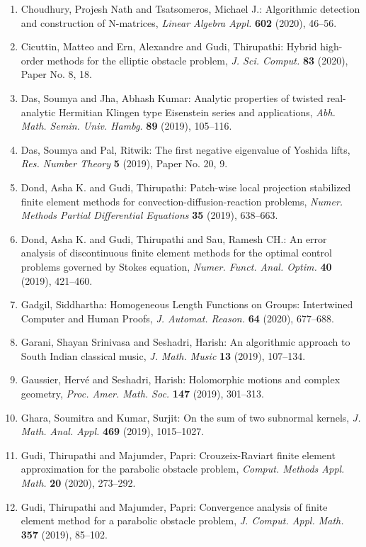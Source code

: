 \begin{enumerate}
\item Choudhury, Projesh Nath and Tsatsomeros, Michael J.: Algorithmic detection and construction of {N}-matrices, \emph{Linear Algebra Appl.} {\bf 602} (2020), 46--56.
\item Cicuttin, Matteo and Ern, Alexandre and Gudi, Thirupathi: Hybrid high-order methods for the elliptic obstacle problem, \emph{J. Sci. Comput.} {\bf 83} (2020), Paper No. 8, 18.
\item Das, Soumya and Jha, Abhash Kumar: Analytic properties of twisted real-analytic {H}ermitian
{K}lingen type {E}isenstein series and applications, \emph{Abh. Math. Semin. Univ. Hambg.} {\bf 89} (2019), 105--116.
\item Das, Soumya and Pal, Ritwik: The first negative eigenvalue of {Y}oshida lifts, \emph{Res. Number Theory} {\bf 5} (2019), Paper No. 20, 9.
\item Dond, Asha K. and Gudi, Thirupathi: Patch-wise local projection stabilized finite element methods
for convection-diffusion-reaction problems, \emph{Numer. Methods Partial Differential Equations} {\bf 35} (2019), 638--663.
\item Dond, Asha K. and Gudi, Thirupathi and Sau, Ramesh CH.: An error analysis of discontinuous finite element methods for
the optimal control problems governed by {S}tokes equation, \emph{Numer. Funct. Anal. Optim.} {\bf 40} (2019), 421--460.
\item Gadgil, Siddhartha: Homogeneous {L}ength {F}unctions on {G}roups: {I}ntertwined
{C}omputer and {H}uman {P}roofs, \emph{J. Automat. Reason.} {\bf 64} (2020), 677--688.
\item Garani, Shayan Srinivasa and Seshadri, Harish: An algorithmic approach to {S}outh {I}ndian classical music, \emph{J. Math. Music} {\bf 13} (2019), 107--134.
\item Gaussier, Herv\'{e} and Seshadri, Harish: Holomorphic motions and complex geometry, \emph{Proc. Amer. Math. Soc.} {\bf 147} (2019), 301--313.
\item Ghara, Soumitra and Kumar, Surjit: On the sum of two subnormal kernels, \emph{J. Math. Anal. Appl.} {\bf 469} (2019), 1015--1027.
\item Gudi, Thirupathi and Majumder, Papri: Crouzeix-{R}aviart finite element approximation for the
parabolic obstacle problem, \emph{Comput. Methods Appl. Math.} {\bf 20} (2020), 273--292.
\item Gudi, Thirupathi and Majumder, Papri: Convergence analysis of finite element method for a parabolic
obstacle problem, \emph{J. Comput. Appl. Math.} {\bf 357} (2019), 85--102.

\end{enumerate}
